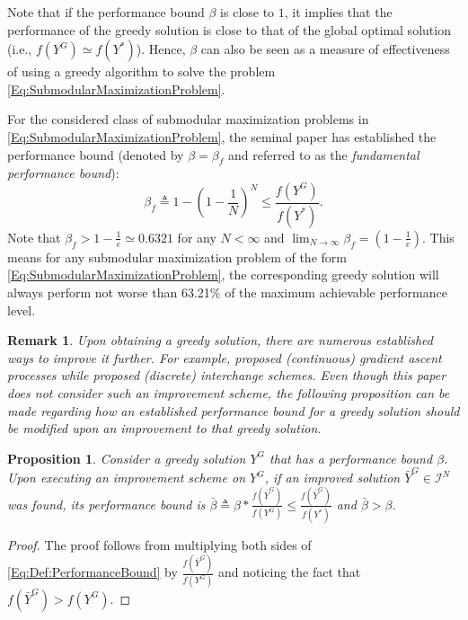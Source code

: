 \documentclass[conference]{IEEEtran}
\newtheorem{proposition}{Proposition}
\newtheorem{remark}{Remark}
\begin{document}
Note that if the performance bound $\beta$ is close to $1$, it implies that the performance of the greedy solution is close to that of the global optimal solution (i.e., $f(Y^G)\simeq f(Y^*)$). Hence, $\beta$ can also be seen as a measure of effectiveness of using a greedy algorithm to solve the problem \eqref{Eq:SubmodularMaximizationProblem}. 

For the considered class of submodular maximization problems in \eqref{Eq:SubmodularMaximizationProblem}, the seminal paper \cite{Nemhauser1978} has established the performance bound (denoted by $\beta=\beta_f$ and referred to as the \emph{fundamental performance bound}):
\begin{equation}\label{Eq:FundamentalPerformanceBound}
    \beta_f \triangleq 1-\left(1-\frac{1}{N}\right)^N \leq \frac{f(Y^G)}{f(Y^*)}.
\end{equation}
Note that $\beta_f > 1-\frac{1}{e} \simeq 0.6321$ for any $N<\infty$ and $\lim_{N\rightarrow\infty} \beta_f = (1-\frac{1}{e})$. This means for any submodular maximization problem of the form \eqref{Eq:SubmodularMaximizationProblem}, the corresponding greedy solution will always perform not worse than 63.21\% of the maximum achievable performance level.


\begin{remark}\label{Rm:Improvements}
Upon obtaining a greedy solution, there are numerous established ways to improve it further. For example, \cite{Sun2019,Sun2020} proposed (continuous) gradient ascent processes while \cite{Nemhauser1978,Welikala2019P3} proposed (discrete) interchange schemes. Even though this paper does not consider such an improvement scheme, the following proposition can be made regarding how an established performance bound for a greedy solution should be modified upon an improvement to that greedy solution. 
\end{remark}


\begin{proposition}\label{Prop:Improvement}
Consider a greedy solution $Y^G$ that has a performance bound $\beta$. Upon executing an improvement scheme on $Y^G$, if an improved solution $\bar{Y}^G\in \mathcal{I}^N$ was found, its performance bound is $\bar{\beta} \triangleq \beta * \frac{f(\bar{Y}^G)}{f(Y^G)} \leq \frac{f(\bar{Y}^G)}{f(Y^*)}$ and $\bar{\beta}>\beta$. 
\end{proposition}

\begin{proof}
The proof follows from multiplying both sides of \eqref{Eq:Def:PerformanceBound} by $\frac{f(\bar{Y}^G)}{f(Y^G)}$ and noticing the fact that $f(\bar{Y}^G)>f(Y^G)$.  
\end{proof}
\end{document}
